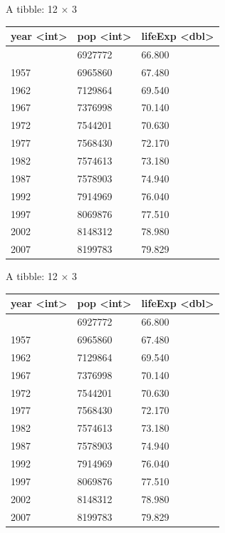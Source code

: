 \documentclass[
  letterpaper,
  DIV=11,
  numbers=noendperiod]{scrreprt}
\newenvironment{Shaded}{\begin{snugshade}}{\end{snugshade}}
\newcommand{\CommentTok}[1]{\textcolor[rgb]{0.37,0.37,0.37}{#1}}
\newcommand{\FunctionTok}[1]{\textcolor[rgb]{0.28,0.35,0.67}{#1}}
\newcommand{\NormalTok}[1]{\textcolor[rgb]{0.00,0.23,0.31}{#1}}
\newcommand{\SpecialCharTok}[1]{\textcolor[rgb]{0.37,0.37,0.37}{#1}}
\newcommand{\StringTok}[1]{\textcolor[rgb]{0.13,0.47,0.30}{#1}}
\begin{document}
\begin{Shaded}
\end{Shaded}

A tibble: 12 × 3

\begin{longtable}[]{@{}lll@{}}
\toprule\noalign{}
year \textless int\textgreater{} & pop \textless int\textgreater{} &
lifeExp \textless dbl\textgreater{} \\
\midrule\noalign{}
\endhead
\bottomrule\noalign{}
\endlastfoot
1952 & 6927772 & 66.800 \\
1957 & 6965860 & 67.480 \\
1962 & 7129864 & 69.540 \\
1967 & 7376998 & 70.140 \\
1972 & 7544201 & 70.630 \\
1977 & 7568430 & 72.170 \\
1982 & 7574613 & 73.180 \\
1987 & 7578903 & 74.940 \\
1992 & 7914969 & 76.040 \\
1997 & 8069876 & 77.510 \\
2002 & 8148312 & 78.980 \\
2007 & 8199783 & 79.829 \\
\end{longtable}

A tibble: 12 × 3

\begin{longtable}[]{@{}lll@{}}
\toprule\noalign{}
year \textless int\textgreater{} & pop \textless int\textgreater{} &
lifeExp \textless dbl\textgreater{} \\
\midrule\noalign{}
\endhead
\bottomrule\noalign{}
\endlastfoot
1952 & 6927772 & 66.800 \\
1957 & 6965860 & 67.480 \\
1962 & 7129864 & 69.540 \\
1967 & 7376998 & 70.140 \\
1972 & 7544201 & 70.630 \\
1977 & 7568430 & 72.170 \\
1982 & 7574613 & 73.180 \\
1987 & 7578903 & 74.940 \\
1992 & 7914969 & 76.040 \\
1997 & 8069876 & 77.510 \\
2002 & 8148312 & 78.980 \\
2007 & 8199783 & 79.829 \\
\end{longtable}
\end{document}
